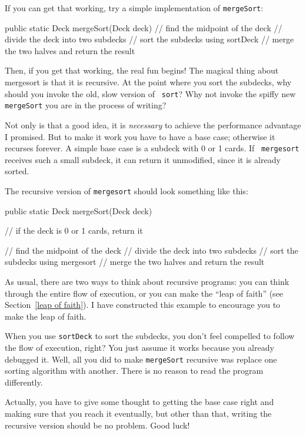 
If you can get that working, try a simple implementation of
{\tt mergeSort}:

\begin{code}
public static Deck mergeSort(Deck deck) {
    // find the midpoint of the deck
    // divide the deck into two subdecks
    // sort the subdecks using sortDeck
    // merge the two halves and return the result
}
\end{code}

Then, if you get that working, the real fun begins!  The magical thing
about mergesort is that it is recursive.  At the point where you sort
the subdecks, why should you invoke the old, slow version of {\tt
sort}?  Why not invoke the spiffy new {\tt mergeSort} you are in the
process of writing?

Not only is that a good idea, it is {\em necessary} to
achieve the performance advantage I promised.  But to make it
work you have to have a base case; otherwise it recurses
forever.  A simple base case is a subdeck with 0 or 1 cards.  If {\tt
mergesort} receives such a small subdeck, it can return it
unmodified, since it is already sorted.

The recursive version of {\tt mergesort} should look something
like this:

\begin{code}
public static Deck mergeSort(Deck deck) {
    // if the deck is 0 or 1 cards, return it

    // find the midpoint of the deck
    // divide the deck into two subdecks
    // sort the subdecks using mergesort
    // merge the two halves and return the result
}
\end{code}
%
As usual, there are two ways to think about recursive programs:
you can think through the entire flow of execution, or you
can make the ``leap of faith'' (see Section~\ref{leap of faith}).
I have constructed this example to encourage you to make the leap of faith.

When you use {\tt sortDeck} to sort the subdecks, you don't
feel compelled to follow the flow of execution, right?  You just
assume it works because you already
debugged it.  Well, all you did to make {\tt mergeSort} recursive was
replace one sorting algorithm with another.  There is no reason to read
the program differently.

Actually, you have to give some thought to getting the
base case right and making sure that you reach it eventually,
but other than that, writing the recursive version should be
no problem.  Good luck!


